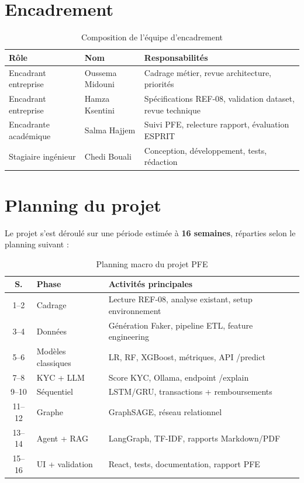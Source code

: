 \section{Encadrement}

\begin{table}[H]
  \centering
  \caption{Composition de l'équipe d'encadrement}
  \begin{tabular}{|l|l|p{7cm}|}
    \hline
    \textbf{Rôle} & \textbf{Nom} & \textbf{Responsabilités} \\
    \hline
    Encadrant entreprise & Oussema Midouni & Cadrage métier, revue architecture, priorités \\
    \hline
    Encadrant entreprise & Hamza Ksentini & Spécifications REF-08, validation dataset, revue technique \\
    \hline
    Encadrante académique & Salma Hajjem & Suivi PFE, relecture rapport, évaluation ESPRIT \\
    \hline
    Stagiaire ingénieur & Chedi Bouali & Conception, développement, tests, rédaction \\
    \hline
  \end{tabular}
\end{table}

\section{Planning du projet}

Le projet s'est déroulé sur une période estimée à \textbf{16 semaines}, réparties selon le planning suivant :

\begin{table}[H]
  \centering
  \caption{Planning macro du projet PFE}
  \label{tab:planning}
  \begin{tabular}{|c|l|p{8cm}|}
    \hline
    \textbf{S.} & \textbf{Phase} & \textbf{Activités principales} \\
    \hline
    1--2 & Cadrage & Lecture REF-08, analyse existant, setup environnement \\
    \hline
    3--4 & Données & Génération Faker, pipeline ETL, feature engineering \\
    \hline
    5--6 & Modèles classiques & LR, RF, XGBoost, métriques, API /predict \\
    \hline
    7--8 & KYC + LLM & Score KYC, Ollama, endpoint /explain \\
    \hline
    9--10 & Séquentiel & LSTM/GRU, transactions + remboursements \\
    \hline
    11--12 & Graphe & GraphSAGE, réseau relationnel \\
    \hline
    13--14 & Agent + RAG & LangGraph, TF-IDF, rapports Markdown/PDF \\
    \hline
    15--16 & UI + validation & React, tests, documentation, rapport PFE \\
    \hline
  \end{tabular}
\end{table}

